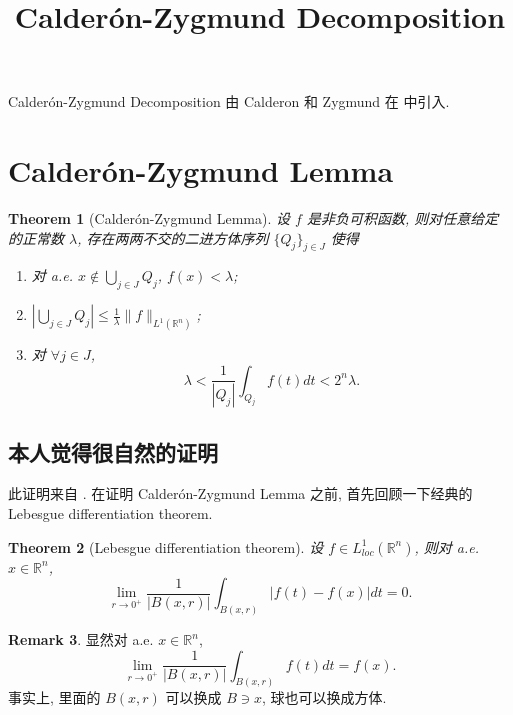\documentclass[a4paper,11pt]{article}
\title{Calder\'on-Zygmund Decomposition}
\newtheorem{theorem}{Theorem}[section]
\theoremstyle{definition}
\newtheorem{remark}[theorem]{Remark}
\begin{document}
\begin{CJK*}{UTF8}{gbsn}

\maketitle

Calder\'on-Zygmund Decomposition 由 Calderon 和 Zygmund 在 \cite{cz52} 中引入.

\section{Calder\'on-Zygmund Lemma}

\begin{theorem}[Calder\'on-Zygmund Lemma] \label{C-Z lemma}
    设 $ f $ 是非负可积函数, 则对任意给定的正常数 $ \lambda $, 存在两两不交的二进方体序列 $ \{Q_j\}_{j \in J} $ 
    使得
    \begin{enumerate}[{\rm(i)}]
        \item 对 a.e. $ x \notin \bigcup_{j \in J} Q_j $, $ f(x) < \lambda $;
        \item $ | \bigcup_{j \in J} Q_j | \leq \frac{1}{\lambda} \| f \|_{L^1(\mathbb{R}^n)} $;
        \item 对 $ \forall j \in J $, 
            $$
                \lambda < \frac{1}{|Q_j|} \int_{Q_j} f(t) dt < 2^n \lambda.
            $$
    \end{enumerate}
\end{theorem}

\subsection{本人觉得很自然的证明}

此证明来自 \cite[Lemma 1.2]{kk13}. 
在证明 Calder\'on-Zygmund Lemma 之前, 首先回顾一下经典的 Lebesgue differentiation theorem.

\begin{theorem}[Lebesgue differentiation theorem]
    设 $ f \in L^1_{loc}(\mathbb{R}^n) $, 则对 a.e. $ x \in \mathbb{R}^n $, 
    $$
        \lim_{r \to 0^+} \frac{1}{|B(x, r)|} \int_{B(x, r)} |f(t) - f(x)| dt = 0.
    $$
\end{theorem}

\begin{remark}
    显然对 a.e. $ x \in \mathbb{R}^n $,
    $$
        \lim_{r \to 0^+} \frac{1}{|B(x, r)|} \int_{B(x, r)} f(t) dt = f(x).
    $$
    事实上, 里面的 $ B(x, r) $ 可以换成 $ B \ni x $, 球也可以换成方体.
\end{remark}


\end{CJK*}
\end{document}
